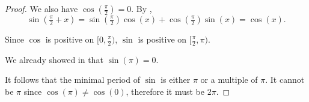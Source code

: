 \begin{proof}
  We also have \( \cos(\tfrac \pi 2) = 0 \). By ,
  \begin{equation*}
    \sin(\tfrac \pi 2 + x)
    =
    \sin(\tfrac \pi 2) \cos(x) + \cos(\tfrac \pi 2) \sin(x)
    =
    \cos(x).
  \end{equation*}

  Since \( \cos \) is positive on \( [0, \tfrac \pi 2) \), \( \sin \) is positive on \( [\tfrac \pi 2, \pi) \).

  We already showed in  that \( \sin(\pi) = 0 \).

  It follows that the minimal period of \( \sin \) is either \( \pi \) or a multiple of \( \pi \). It cannot be \( \pi \) since \( \cos(\pi) \neq \cos(0) \), therefore it must be \( 2\pi \).

\end{proof}

